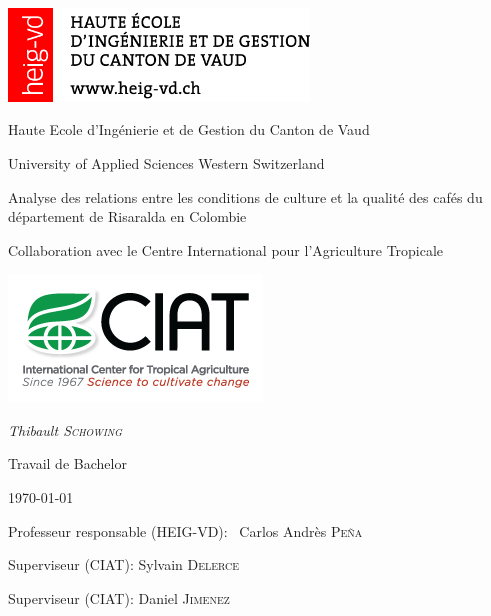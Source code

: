 \documentclass[11pt,a4paper,twoside,openright]{report}
\author{Thibault Schowing}
\newcommand\blankpage{%
	\null
	\thispagestyle{empty}%
	\addtocounter{page}{-1}%
	\newpage}
\begin{document}
	
	
	\dominitoc
	\begin{titlepage}
		\centering
		
		\includegraphics[width=0.6\textwidth]{HEIG-VD_Logo_96x29_RVB_ROUGE}\par
		\vspace{0.5cm}
		\small{Haute Ecole d'Ingénierie et de Gestion du Canton de Vaud  \par}
		\footnotesize{University of Applied Sciences Western Switzerland\par}
		\vspace{1cm}
		
		
		
		\vspace{1cm}
		\Large{Analyse des relations entre les conditions de culture et la qualité des cafés du département de Risaralda en Colombie\par}
		\vspace{1.5cm}
		\small{Collaboration avec le Centre International pour l'Agriculture Tropicale  \par}
		\vspace{1cm}
		
		
		\includegraphics[width=0.4\linewidth]{img/CIAT_logo_light_PNG/CIAT-Logo-255x128}
		
		\vspace{2cm}
		\small\textit{Thibault \textsc{Schowing}}\par
		\small{Travail de Bachelor}\par
		\small{\today\par}
		
		\vfill
		Professeur responsable (HEIG-VD): ~Carlos Andrès \textsc{Peña}\par
		Superviseur (CIAT): Sylvain \textsc{Delerce} \par
		Superviseur (CIAT): Daniel \textsc{Jimenez}
		
		
	\end{titlepage}
	\restoregeometry 
	
\end{document}
